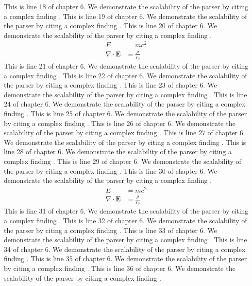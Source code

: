 This is line 18 of chapter 6. We demonstrate the scalability of the parser by citing a complex finding \cite{ref6_18}.
This is line 19 of chapter 6. We demonstrate the scalability of the parser by citing a complex finding \cite{ref6_19}.
This is line 20 of chapter 6. We demonstrate the scalability of the parser by citing a complex finding \cite{ref6_20}.
\begin{align*}
  E &= mc^2 \\
  \nabla \cdot \mathbf{E} &= \frac{\rho}{\varepsilon_0}
\end{align*}
This is line 21 of chapter 6. We demonstrate the scalability of the parser by citing a complex finding \cite{ref6_21}.
This is line 22 of chapter 6. We demonstrate the scalability of the parser by citing a complex finding \cite{ref6_22}.
This is line 23 of chapter 6. We demonstrate the scalability of the parser by citing a complex finding \cite{ref6_23}.
This is line 24 of chapter 6. We demonstrate the scalability of the parser by citing a complex finding \cite{ref6_24}.
This is line 25 of chapter 6. We demonstrate the scalability of the parser by citing a complex finding \cite{ref6_25}.
This is line 26 of chapter 6. We demonstrate the scalability of the parser by citing a complex finding \cite{ref6_26}.
This is line 27 of chapter 6. We demonstrate the scalability of the parser by citing a complex finding \cite{ref6_27}.
This is line 28 of chapter 6. We demonstrate the scalability of the parser by citing a complex finding \cite{ref6_28}.
This is line 29 of chapter 6. We demonstrate the scalability of the parser by citing a complex finding \cite{ref6_29}.
This is line 30 of chapter 6. We demonstrate the scalability of the parser by citing a complex finding \cite{ref6_30}.
\begin{align*}
  E &= mc^2 \\
  \nabla \cdot \mathbf{E} &= \frac{\rho}{\varepsilon_0}
\end{align*}
This is line 31 of chapter 6. We demonstrate the scalability of the parser by citing a complex finding \cite{ref6_31}.
This is line 32 of chapter 6. We demonstrate the scalability of the parser by citing a complex finding \cite{ref6_32}.
This is line 33 of chapter 6. We demonstrate the scalability of the parser by citing a complex finding \cite{ref6_33}.
This is line 34 of chapter 6. We demonstrate the scalability of the parser by citing a complex finding \cite{ref6_34}.
This is line 35 of chapter 6. We demonstrate the scalability of the parser by citing a complex finding \cite{ref6_35}.
This is line 36 of chapter 6. We demonstrate the scalability of the parser by citing a complex finding \cite{ref6_36}.
